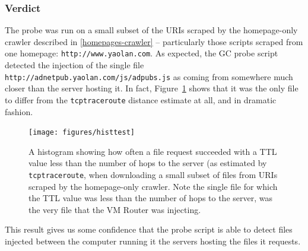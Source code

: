 \subsubsection{Verdict}
The probe was run on a small subset of the URIs scraped by the homepage-only crawler described in \autoref{homepages-crawler} -- particularly those scripts scraped from one homepage: \texttt{http://www.yaolan.com}.
As expected, the GC probe script detected the injection of the single file \texttt{http://adnetpub.yaolan.com/js/adpubs.js} as coming from somewhere much closer than the server hosting it.
In fact, Figure~\ref{fig_histtest} shows that it was the only file to differ from the \texttt{tcptraceroute} distance estimate at all, and in dramatic fashion.
\begin{figure}
	\texttt{[image: figures/histtest]}
	\caption{
		A histogram showing how often a file request succeeded with a TTL value less than the number of hops to the server (as estimated by \texttt{tcptraceroute}, when downloading a small subset of files from URIs scraped by the homepage-only crawler.
		Note the single file for which the TTL value was less than the number of hops to the server, was the very file that the VM Router was injecting.
	}
	\label{fig_histtest}
\end{figure}
This result gives us some confidence that the probe script is able to detect files injected between the computer running it the servers hosting the files it requests.